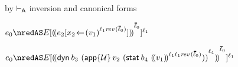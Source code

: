 {\begin{lamportproof*}
    \begin{pfproof}
        \begin{pfproof}
          by $\vdash_{\mathsf{A}}$ inversion and canonical forms
        \end{pfproof}
        \begin{pfproof}
          \qedstep
            \begin{pfproof}
              $\sexpr_0 \nredAS \ctx\ctxbars{\obbars{\esubst{\sexpr_2}{\svar_2}{\obars{\svalue_1}{\fconcat{\sowner_1}{\frev{\sownerlist_0}}}}}{\sownerlist_0}}{\sowner_1}$
            \end{pfproof}
        \end{pfproof}
        \begin{pfproof}
          \qedstep
            \begin{pfproof}
              \(\sexpr_0 \nredAS
                \ctx\ctxbars{\obbars{\edynb{\sbnd_3}{\obars{\eapp{\tdyn}{\svalue_2}{(\estab{\sbnd_4}{\obbars{\svalue_1}{\fconcat{\sowner_1}{\fconcat{\sowner_1}{\frev{\sownerlist_0}}}}})}}{\sowner_4}}}{\sownerlist_0}}{\sowner_1}
              \)
            \end{pfproof}
        \end{pfproof}
    \end{pfproof}


\end{lamportproof*}}
